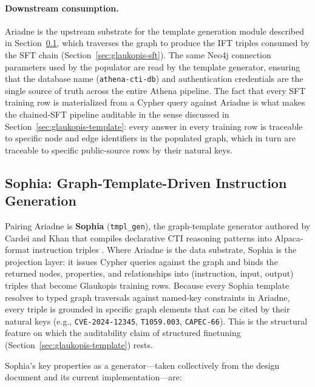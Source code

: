 \documentclass[unnumsec,webpdf,contemporary,large]{oup-authoring-template}
\theoremstyle{thmstyleone}
\theoremstyle{thmstyletwo}
\theoremstyle{thmstylethree}
\begin{document}
\paragraph{Downstream consumption.}
Ariadne is the upstream substrate for the template generation module described in Section~\ref{sec:ariadne-templates}, which traverses the graph to produce the IFT triples consumed by the SFT chain (Section~\ref{sec:glaukopis-sft}). The same Neo4j connection parameters used by the populator are read by the template generator, ensuring that the database name (\texttt{athena-cti-db}) and authentication credentials are the single source of truth across the entire Athena pipeline. The fact that every SFT training row is materialized from a Cypher query against Ariadne is what makes the chained-SFT pipeline auditable in the sense discussed in Section~\ref{sec:glaukopis-template}: every answer in every training row is traceable to specific node and edge identifiers in the populated graph, which in turn are traceable to specific public-source rows by their natural keys.

\subsection{Sophia: Graph-Template-Driven Instruction Generation}
\label{sec:ariadne-templates}

Pairing Ariadne is \textbf{Sophia} (\texttt{tmpl\_gen}), the graph-template generator authored by Cardei and Khan that compiles declarative CTI reasoning patterns into Alpaca-format instruction triples \cite{cardei2025ift}. Where Ariadne is the data substrate, Sophia is the projection layer: it issues Cypher queries against the graph and binds the returned nodes, properties, and relationships into (instruction, input, output) triples that become Glaukopis training rows. Because every Sophia template resolves to typed graph traversals against named-key constraints in Ariadne, every triple is grounded in specific graph elements that can be cited by their natural keys (e.g., \texttt{CVE-2024-12345}, \texttt{T1059.003}, \texttt{CAPEC-66}). This is the structural feature on which the auditability claim of structured finetuning (Section~\ref{sec:glaukopis-template}) rests.

Sophia's key properties as a generator---taken collectively from the design document and its current implementation---are:
\end{document}

